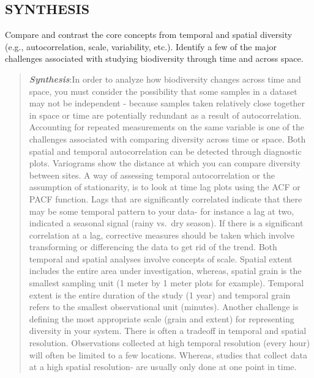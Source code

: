 \documentclass[]{article}
\begin{document}
\subsection{SYNTHESIS}\label{synthesis}

Compare and contrast the core concepts from temporal and spatial
diversity (e.g., autocorrelation, scale, variability, etc.). Identify a
few of the major challenges associated with studying biodiversity
through time and across space.

\begin{quote}
\textbf{\emph{Synthesis}}:In order to analyze how biodiversity changes
across time and space, you must consider the possibility that some
samples in a dataset may not be independent - because samples taken
relatively close together in space or time are potentially redundant as
a result of autocorrelation. Accounting for repeated measurements on the
same variable is one of the challenges associated with comparing
diversity across time or space. Both spatial and temporal
autocorrelation can be detected through diagnostic plots. Variograms
show the distance at which you can compare diversity between sites. A
way of assessing temporal autocorrelation or the assumption of
stationarity, is to look at time lag plots using the ACF or PACF
function. Lags that are significantly correlated indicate that there may
be some temporal pattern to your data- for instance a lag at two,
indicated a seasonal signal (rainy vs.~dry season). If there is a
significant correlation at a lag, corrective measures should be taken
which involve transforming or differencing the data to get rid of the
trend. Both temporal and spatial analyses involve concepts of scale.
Spatial extent includes the entire area under investigation, whereas,
spatial grain is the smallest sampling unit (1 meter by 1 meter plots
for example). Temporal extent is the entire duration of the study (1
year) and temporal grain refers to the smallest observational unit
(minutes). Another challenge is defining the most appropriate scale
(grain and extent) for representing diversity in your system. There is
often a tradeoff in temporal and spatial resolution. Observations
collected at high temporal resolution (every hour) will often be limited
to a few locations. Whereas, studies that collect data at a high spatial
resolution- are usually only done at one point in time.
\end{quote}
\end{document}
